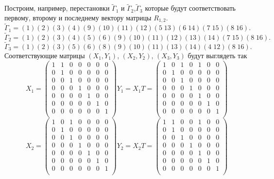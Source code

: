 Построим, например, перестановки $\widetilde\Gamma_1$ и
$\widetilde\Gamma_2$,$\widetilde\Gamma_3$ которые будут
соответствовать первому, второму и последнему вектору матрицы
$R_{1,2}$.
$$
\widetilde\Gamma_1=(1)(2)(3)(4)(9)(10)(11)(12)(5\;13)(6\;14)(7\;15)(8\;16).
$$
$$
\widetilde\Gamma_2=(1)(2)(3)(4)(5)(6)(9)(10)(11)(12)(13)(14)(7\;15)(8\;16).
$$
$$
\widetilde\Gamma_3=(1)(2)(3)(5)(6)(8)(9)(10)(11)(13)(14)(4\;12)(8\;16).
$$
Соответствующие матрицы $(X_1,Y_1)$, $(X_2,Y_2)$, $(X_3,Y_3)$ будут
выглядеть так
$$
X_1=\begin{pmatrix}
1&1&0&0&0&0&0\\
0&1&0&0&0&0&0\\
0&0&1&0&0&0&0\\
0&0&0&1&0&0&0\\
0&0&0&0&1&0&0\\
0&0&0&0&0&1&0\\
0&0&0&0&0&0&1\\
\end{pmatrix}
Y_1=X_1T=\begin{pmatrix}
1&0&1&0&1&0&0\\
0&1&0&0&0&0&0\\
0&0&1&0&0&0&0\\
0&0&0&1&0&0&0\\
0&0&0&0&1&0&0\\
0&0&0&0&0&1&0\\
0&0&0&0&0&0&1\\
\end{pmatrix}
$$
$$
X_2=\begin{pmatrix}
1&0&1&0&0&0&0\\
0&1&0&0&0&0&0\\
0&0&1&0&0&0&0\\
0&0&0&1&0&0&0\\
0&0&0&0&1&0&0\\
0&0&0&0&0&1&0\\
0&0&0&0&0&0&1\\
\end{pmatrix}
Y_2=X_2T=\begin{pmatrix}
1&1&0&0&1&0&0\\
0&1&0&0&0&0&0\\
0&0&1&0&0&0&0\\
0&0&0&1&0&0&0\\
0&0&0&0&1&0&0\\
0&0&0&0&0&1&0\\
0&0&0&0&0&0&1\\
\end{pmatrix}
$$
